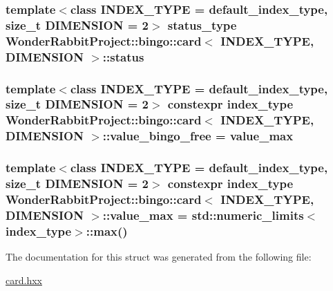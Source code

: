 \hypertarget{structWonderRabbitProject_1_1bingo_1_1card_a27c1c5693dfef24d350bc530e61422ae}{
\subsubsection[{status}]{\setlength{\rightskip}{0pt plus 5cm}template$<$class I\-N\-D\-E\-X\-\_\-\-T\-Y\-P\-E  = default\-\_\-index\-\_\-type, size\-\_\-t D\-I\-M\-E\-N\-S\-I\-O\-N = 2$>$ status\-\_\-type {\bf Wonder\-Rabbit\-Project\-::bingo\-::card}$<$ I\-N\-D\-E\-X\-\_\-\-T\-Y\-P\-E, D\-I\-M\-E\-N\-S\-I\-O\-N $>$\-::status\hspace{0.3cm}{\ttfamily [private]}}}\label{structWonderRabbitProject_1_1bingo_1_1card_a27c1c5693dfef24d350bc530e61422ae}
\hypertarget{structWonderRabbitProject_1_1bingo_1_1card_aea4ef488a201046ec273ef9673d8ff7f}{
\subsubsection[{value\-\_\-bingo\-\_\-free}]{\setlength{\rightskip}{0pt plus 5cm}template$<$class I\-N\-D\-E\-X\-\_\-\-T\-Y\-P\-E  = default\-\_\-index\-\_\-type, size\-\_\-t D\-I\-M\-E\-N\-S\-I\-O\-N = 2$>$ constexpr index\-\_\-type {\bf Wonder\-Rabbit\-Project\-::bingo\-::card}$<$ I\-N\-D\-E\-X\-\_\-\-T\-Y\-P\-E, D\-I\-M\-E\-N\-S\-I\-O\-N $>$\-::value\-\_\-bingo\-\_\-free = {\bf value\-\_\-max}\hspace{0.3cm}{\ttfamily [static]}}}\label{structWonderRabbitProject_1_1bingo_1_1card_aea4ef488a201046ec273ef9673d8ff7f}
\hypertarget{structWonderRabbitProject_1_1bingo_1_1card_a5409fd54b41693dd89b811ffaef710b2}{
\subsubsection[{value\-\_\-max}]{\setlength{\rightskip}{0pt plus 5cm}template$<$class I\-N\-D\-E\-X\-\_\-\-T\-Y\-P\-E  = default\-\_\-index\-\_\-type, size\-\_\-t D\-I\-M\-E\-N\-S\-I\-O\-N = 2$>$ constexpr index\-\_\-type {\bf Wonder\-Rabbit\-Project\-::bingo\-::card}$<$ I\-N\-D\-E\-X\-\_\-\-T\-Y\-P\-E, D\-I\-M\-E\-N\-S\-I\-O\-N $>$\-::value\-\_\-max = std\-::numeric\-\_\-limits$<$index\-\_\-type$>$\-::max()\hspace{0.3cm}{\ttfamily [static]}}}\label{structWonderRabbitProject_1_1bingo_1_1card_a5409fd54b41693dd89b811ffaef710b2}


The documentation for this struct was generated from the following file\-:\begin{DoxyCompactItemize}
\item 
\hyperlink{card_8hxx}{card.\-hxx}\end{DoxyCompactItemize}
